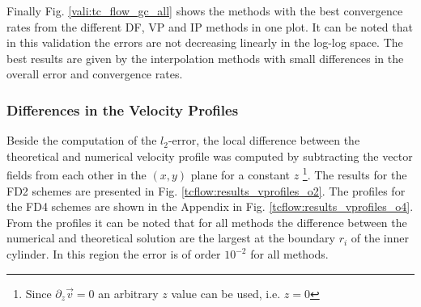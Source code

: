 Finally Fig. \ref{vali:tc_flow_gc_all} shows the methods with the best convergence
rates from the different DF, VP and IP methods in one plot.
It can be noted that in this validation the errors are not decreasing linearly in the log-log space.
The best results are given by the interpolation methods with small differences in the overall error
and convergence rates.

\subsubsection{Differences in the Velocity Profiles}

Beside the computation of the $l_2$-error, the local difference between the theoretical and numerical velocity
profile was computed by subtracting the vector fields from each other in the $(x, y)$ plane for a constant $z$
\footnote{Since $\partial_z \vec{v} = 0$ an arbitrary $z$ value can be used, i.e. $z=0$}.
The results for the FD2 schemes are presented in Fig. \ref{tcflow:results_vprofiles_o2}. The profiles
for the FD4 schemes are shown in the Appendix in Fig. \ref{tcflow:results_vprofiles_o4}.
From the profiles it can be noted that for all methods the difference between the numerical and
theoretical solution are the largest at the boundary $r_i$ of the  inner cylinder.
In this region the error is of order $10^{-2}$ for all methods.


